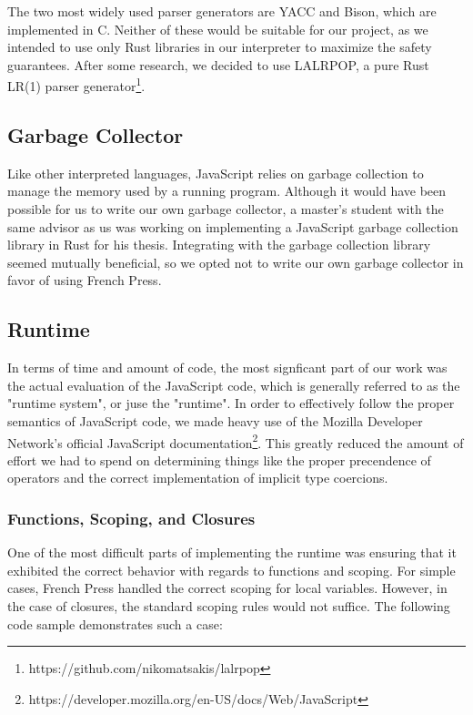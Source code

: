 \documentclass{article}
\begin{document}
The two most widely used parser generators are YACC and Bison, which are
implemented in C. Neither of these would be suitable for our project, as we
intended to use only Rust libraries in our interpreter to maximize the safety
guarantees. After some research, we decided to use LALRPOP, a pure Rust LR(1)
parser generator\footnote{https://github.com/nikomatsakis/lalrpop}.

\subsection*{Garbage Collector}

Like other interpreted languages, JavaScript relies on garbage collection to
manage the memory used by a running program. Although it would have been
possible for us to write our own garbage collector, a master's student
with the same advisor as us was working on implementing a JavaScript garbage
collection library in Rust for his thesis. Integrating with the garbage
collection library seemed mutually beneficial, so we opted not to write our own
garbage collector in favor of using French Press.

\subsection*{Runtime}

In terms of time and amount of code, the most signficant part of our work was
the actual evaluation of the JavaScript code, which is generally referred to as
the "runtime system", or juse the "runtime". In order to effectively follow the
proper semantics of JavaScript code, we made heavy use of the Mozilla Developer
Network's official JavaScript
documentation\footnote{https://developer.mozilla.org/en-US/docs/Web/JavaScript}.
This greatly reduced the amount of effort we had to spend on determining things
like the proper precendence of operators and the correct implementation of
implicit type coercions.

\subsubsection*{Functions, Scoping, and Closures}

One of the most difficult parts of implementing the runtime was ensuring that it
exhibited the correct behavior with regards to functions and scoping. For simple
cases, French Press handled the correct scoping for local variables. However,
in the case of closures, the standard scoping rules would not suffice. The
following code sample demonstrates such a case:
\end{document}
